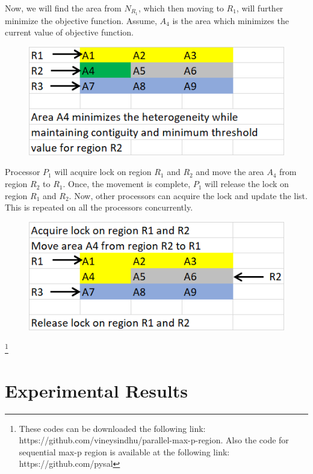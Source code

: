 \documentclass[conference]{IEEEtran}
\begin{document}
Now, we will find the area from $N_{R_1}$, which then moving to $R_1$, will
further minimize the objective function. Assume, $A_4$ is the area which
minimizes the current value of objective function. \\

\begin{figure}[h]
\includegraphics[scale=0.85]{o3.png}
\end{figure}

Processor $P_1$ will acquire lock on region $R_1$ and $R_2$ and move the area $A_4$ from region $R_2$ to
$R_1$. Once, the movement is complete, $P_1$ will release the lock on region $R_1$ and $R_2$. Now, other processors can acquire the lock and update the list. This is repeated on all the processors concurrently. \\

\begin{figure}[h]
\includegraphics[scale=0.85]{o4.png}
\end{figure}

\footnote{These codes can be downloaded the following link: https://github.com/vineysindhu/parallel-max-p-region.
Also the code for sequential max-p region is available at the following link: https://github.com/pysal}

\section{Experimental Results}\label{s:experimental}
\end{document}

